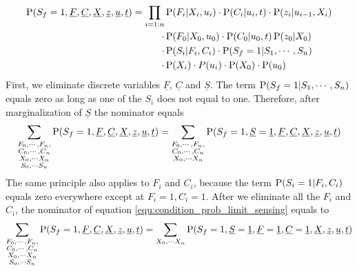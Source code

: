 \begin{equation}
\begin{split}
\operatorname*{\text{P}}( S_f = 1, \underline{F}, \underline{C}, \underline{X}, \underline{z},\underline{u},\underline{t}) = \prod\limits_{i = 1:n} &\operatorname*{\text{P}}(F_i | X_i, u_i) \cdot \operatorname*{\text{P}}(C_i | u_i, t)\cdot   \operatorname*{\text{P}}(z_i|u_{i-1}, X_i) \\
              \cdot & \operatorname*{\text{P}}(F_0 | X_0, u_0)\cdot \operatorname*{\text{P}}(C_0 | u_0, t)  \operatorname*{\text{P}}(z_0|X_0 )\\
              \cdot &\operatorname*{\text{P}}(S_i | F_i, C_i) \cdot  \operatorname*{\text{P}}(S_f=1| S_1, \cdots, S_n)   \\
              \cdot &\operatorname*{\text{P}}(X_i)\cdot P(u_i) \cdot\operatorname*{\text{P}}(X_0) \cdot \operatorname*{\text{P}}(u_0) 
\end{split}
\label{equ:cpd_graph}
\end{equation}
First, we eliminate discrete variables $\underline{F}$, $\underline{C}$ and $\underline{S}$.
The term $\operatorname*{\text{P}}(S_f=1| S_1, \cdots, S_n)$ equals zero as long as one of the $S_i$ does not equal to one. Therefore, after marginalization of $\underline{S}$ the nominator equals
\begin{equation}
\begin{split}
\sum\limits_{\substack{F_0,\cdots,F_n,\\ C_0,\cdots,C_n \\ X_0,\cdots X_n \\ S_0,\cdots S_n} }\operatorname*{\text{P}}( S_f = 1, \underline{F}, \underline{C}, \underline{X}, \underline{z},\underline{u}, \underline{t}) = \sum\limits_{\substack{F_0,\cdots,F_n,\\ C_0,\cdots,C_n \\ X_0,\cdots X_n  }} \operatorname*{\text{P}}( S_f = 1, \underline{S} = \underline{1}, \underline{F}, \underline{C}, \underline{X}, \underline{z},\underline{u}, \underline{t})
\end{split}
\label{equ:after_maginalizing_s}
\end{equation}
The same principle also applies to $F_i$ and $C_i$, because the term $\operatorname*{\text{P}}(S_i = 1 | F_i, C_i)$ equals zero everywhere except at $F_i=1,C_i=1 $. After we eliminate all the  $F_i$ and $C_i$, the nominator of equation \ref{equ:condition_prob_limit_sensing} equals to 
\begin{equation}
\begin{split}
\sum\limits_{\substack{F_0,\cdots,F_n,\\ C_0,\cdots,C_n \\ X_0,\cdots X_n \\ S_0,\cdots S_n} }\operatorname*{\text{P}}( S_f = 1, \underline{F}, \underline{C}, \underline{X}, \underline{z},\underline{u}, \underline{t}) = \sum\limits_{ X_0,\cdots X_n } \operatorname*{\text{P}}( S_f = 1, \underline{S} = \underline{1}, \underline{F} = \underline{1}, \underline{C} = \underline{1}, \underline{X}, \underline{z},\underline{u}, \underline{t})
\end{split}
\label{equ:after_maginalizing_cf}
\end{equation}
